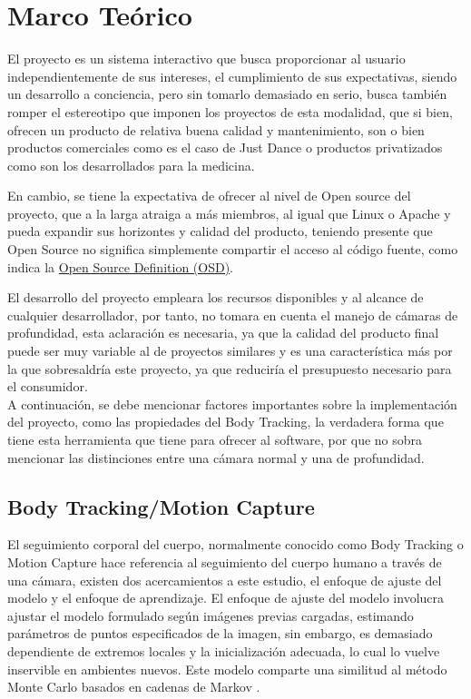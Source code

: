 \chapter{Marco Teórico}


El proyecto es un sistema interactivo que busca proporcionar al usuario independientemente de sus intereses, el cumplimiento de sus expectativas, siendo un desarrollo a conciencia, pero sin tomarlo demasiado en serio, busca también romper el estereotipo que imponen los proyectos de esta modalidad, que si bien, ofrecen un producto de relativa buena calidad y mantenimiento, son o bien productos comerciales como es el caso de Just Dance o productos privatizados como son los desarrollados para la medicina. 

En cambio, se tiene la expectativa de ofrecer al nivel de Open source del proyecto, que a la larga atraiga a más miembros, al igual que Linux o Apache y pueda expandir sus horizontes y calidad del producto, teniendo presente que Open Source no significa simplemente compartir el acceso al código fuente, como indica la \href{https://opensource.org/docs/definition.html}{Open Source Definition (OSD)}. 

El desarrollo del proyecto empleara los recursos disponibles y al alcance de cualquier desarrollador, por tanto, no tomara en cuenta el manejo de cámaras de profundidad, esta aclaración es necesaria, ya que la calidad del producto final puede ser muy variable al de proyectos similares y es una característica más por la que sobresaldría este proyecto, ya que reduciría el presupuesto necesario para el consumidor.\\

A continuación, se debe mencionar factores importantes sobre la implementación del proyecto, como las propiedades del Body Tracking, la verdadera forma que tiene esta herramienta que tiene para ofrecer al software, por que no sobra mencionar las distinciones entre una cámara normal y una de profundidad.


\section{Body Tracking/Motion Capture}

El seguimiento corporal del cuerpo, normalmente conocido como Body Tracking o Motion Capture hace referencia al seguimiento del cuerpo humano a través de una cámara, existen dos acercamientos a este estudio, el enfoque de ajuste del modelo y el enfoque de aprendizaje. El enfoque de ajuste del modelo involucra ajustar el modelo formulado según imágenes previas cargadas, estimando parámetros de puntos especificados de la imagen, sin embargo, es demasiado dependiente de extremos locales y la inicialización adecuada, lo cual lo vuelve inservible en ambientes nuevos. Este modelo comparte una similitud al método Monte Carlo basados en cadenas de Markov \cite{siddiqui2010human}.

